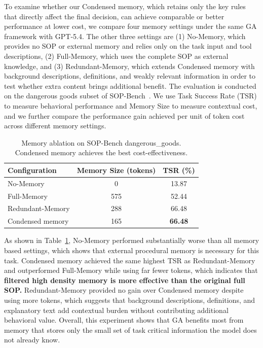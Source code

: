 To examine whether our Condensed memory, which retains only the key rules that directly affect the final decision, can achieve comparable or better performance at lower cost, we compare four memory settings under the same GA framework with GPT-5.4. 
The other three settings are 
(1) No-Memory, which provides no SOP or external memory and relies only on the task input and tool descriptions, 
(2) Full-Memory, which uses the complete SOP as external knowledge, and 
(3) Redundant-Memory, which extends Condensed memory with background descriptions, definitions, and weakly relevant information in order to test whether extra content brings additional benefit.
The evaluation is conducted on the dangerous goods subset of SOP-Bench~\citep{sopbench}.
We use Task Success Rate (TSR) to measure behavioral performance and Memory Size to measure contextual cost, and we further compare the performance gain achieved per unit of token cost across different memory settings.


\begin{table}[t]
\centering
\caption{Memory ablation on SOP-Bench dangerous\_goods. Condensed memory achieves the best cost-effectiveness.}
\label{tab:memory_ablation}
\begin{tabular}{lcc}
\toprule
\textbf{Configuration} & \textbf{Memory Size (tokens)} & \textbf{TSR (\%)} \\
\midrule
No-Memory & 0 & 13.87 \\
Full-Memory & 575 & 52.44 \\
Redundant-Memory & 288 & 66.48 \\
Condensed memory & 165 & \textbf{66.48} \\
\bottomrule
\end{tabular}
\end{table}

As shown in Table~\ref{tab:memory_ablation}, No-Memory performed substantially worse than all memory based settings, which shows that external procedural memory is necessary for this task. 
Condensed memory achieved the same highest TSR as Redundant-Memory and outperformed Full-Memory while using far fewer tokens, which indicates that \textbf{filtered high density memory is more effective than the original full SOP. }
Redundant-Memory provided no gain over Condensed memory despite using more tokens, which suggests that background descriptions, definitions, and explanatory text add contextual burden without contributing additional behavioral value. 
Overall, this experiment shows that GA benefits most from memory that stores only the small set of task critical information the model does not already know.

